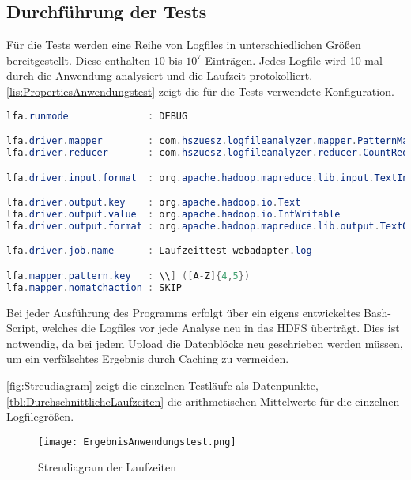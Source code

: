 \subsection{Durchführung der Tests}
Für die Tests werden eine Reihe von Logfiles in unterschiedlichen Größen bereitgestellt. Diese enthalten $10$ bis $10^7$ Einträgen. Jedes Logfile wird 10 mal durch die Anwendung analysiert und die Laufzeit protokolliert. \autoref{lis:PropertiesAnwendungstest} zeigt die für die Tests verwendete Konfiguration. \\

\begin{lstlisting}[language=Java,caption=Properties für Anwendungstest,label=lis:PropertiesAnwendungstest]
lfa.runmode              : DEBUG

lfa.driver.mapper        : com.hszuesz.logfileanalyzer.mapper.PatternMapper
lfa.driver.reducer       : com.hszuesz.logfileanalyzer.reducer.CountReducer

lfa.driver.input.format  : org.apache.hadoop.mapreduce.lib.input.TextInputFormat

lfa.driver.output.key    : org.apache.hadoop.io.Text
lfa.driver.output.value  : org.apache.hadoop.io.IntWritable
lfa.driver.output.format : org.apache.hadoop.mapreduce.lib.output.TextOutputFormat

lfa.driver.job.name      : Laufzeittest webadapter.log

lfa.mapper.pattern.key   : \\] ([A-Z]{4,5})
lfa.mapper.nomatchaction : SKIP
\end{lstlisting}

Bei jeder Ausführung des Programms erfolgt über ein eigens entwickeltes Bash-Script, welches die Logfiles vor jede Analyse neu in das \ac{HDFS} überträgt. Dies ist notwendig, da bei jedem Upload die Datenblöcke neu geschrieben werden müssen, um ein verfälschtes Ergebnis durch Caching zu vermeiden.

\autoref{fig:Streudiagram} zeigt die einzelnen Testläufe als Datenpunkte, \autoref{tbl:DurchschnittlicheLaufzeiten} die arithmetischen Mittelwerte für die einzelnen Logfilegrößen.

\begin{figure}[h]
	\centering
	\texttt{[image: ErgebnisAnwendungstest.png]}
	\caption{Streudiagram der Laufzeiten}
	\label{fig:Streudiagram}
\end{figure}

